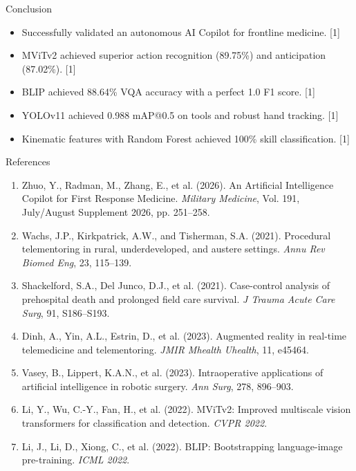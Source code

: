 \documentclass[aspectratio=169, 10pt]{beamer}
\begin{document}
\begin{frame}{Conclusion}
    \vspace{0.3cm}
    \begin{itemize}
        \setlength{\itemsep}{8pt}
        \item Successfully validated an autonomous AI Copilot for frontline medicine. [1]
        \item MViTv2 achieved superior action recognition (89.75\%) and anticipation (87.02\%). [1]
        \item BLIP achieved 88.64\% VQA accuracy with a perfect 1.0 F1 score. [1]
        \item YOLOv11 achieved 0.988 mAP@0.5 on tools and robust hand tracking. [1]
        \item Kinematic features with Random Forest achieved 100\% skill classification. [1]
    \end{itemize}
\end{frame}

\begin{frame}{References}
    \vspace{0.15cm}
    \scriptsize
    \begin{enumerate}
        \setlength{\itemsep}{3pt}
        \item Zhuo, Y., Radman, M., Zhang, E., et al. (2026). An Artificial Intelligence Copilot for First Response Medicine. \textit{Military Medicine}, Vol. 191, July/August Supplement 2026, pp. 251--258.
        \item Wachs, J.P., Kirkpatrick, A.W., and Tisherman, S.A. (2021). Procedural telementoring in rural, underdeveloped, and austere settings. \textit{Annu Rev Biomed Eng}, 23, 115--139.
        \item Shackelford, S.A., Del Junco, D.J., et al. (2021). Case-control analysis of prehospital death and prolonged field care survival. \textit{J Trauma Acute Care Surg}, 91, S186--S193.
        \item Dinh, A., Yin, A.L., Estrin, D., et al. (2023). Augmented reality in real-time telemedicine and telementoring. \textit{JMIR Mhealth Uhealth}, 11, e45464.
        \item Vasey, B., Lippert, K.A.N., et al. (2023). Intraoperative applications of artificial intelligence in robotic surgery. \textit{Ann Surg}, 278, 896--903.
        \item Li, Y., Wu, C.-Y., Fan, H., et al. (2022). MViTv2: Improved multiscale vision transformers for classification and detection. \textit{CVPR 2022}.
        \item Li, J., Li, D., Xiong, C., et al. (2022). BLIP: Bootstrapping language-image pre-training. \textit{ICML 2022}.
    \end{enumerate}
\end{frame}
\end{document}
